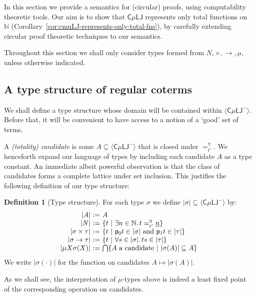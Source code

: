 \documentclass[10pt,a4paper]{amsart}
\theoremstyle{plain}
\theoremstyle{definition}
\newtheorem{definition}[definition]{Definition}
\theoremstyle{plain}
\theoremstyle{definition} %
\newcommand{\numeral}[1]{\underline{#1}}
\newcommand{\Nat}{\mathbb{N}}
\newcommand{\closure}[1]{\langle #1 \rangle}
\newcommand{\nat}{\mathit{N}}
\newcommand{\N}{\nat} %
\newcommand{\arrow}{\to}
\newcommand{\LJ}{\mathsf{LJ}}
\newcommand{\muLJ}{\mu\LJ}
\newcommand{\circular}{\mathsf C}
\newcommand{\cmuLJ}{\circular\muLJ}
\newcommand{\cmuLJneg}{\cmuLJ^-}
\newcommand{\proj}[1]{\mathsf{p}_{#1}}
\newcommand{\reductionnorec}{\mathrm{r}'}
\newcommand{\convertsnoreceta}{=_{\reductionnorec}^\eta} %
\newcommand{\hr}[1]{|#1|}
\begin{document}
In this section we provide a semantics for (circular) proofs, using computability theoretic tools.
Our aim is to show that $\cmuLJ$ represents only total functions on $\Nat$ (Corollary~\ref{cor:cmuLJ-represents-only-total-fns}), by carefully extending circular proof theoretic techniques to our semantics.

Throughout this section we shall only consider types formed from $\N, \times, \arrow, \mu$, unless otherwise indicated.

\subsection{A type structure of regular coterms}
We shall define a type structure whose domain will be contained within $\closure \cmuLJneg$. 
Before that, it will be convenient to have access to a notion of a `good' set of terms.
% 

A \emph{(totality) candidate} is some $A\subseteq \closure \cmuLJneg$ that is closed under $\convertsnoreceta$.
We henceforth expand our language of types by including each candidate $A$ as a type constant. 
% 
An immediate albeit powerful observation is that the class of candidates forms a complete lattice under set inclusion.
This justifies the following definition of our type structure:
\begin{definition}
    [Type structure]
    \label{def:hr}
    For each type $\sigma$ we define $\hr\sigma \subseteq \closure \cmuLJneg$ by:
    \[
    \begin{array}{r@{\ := \ }l}
         \hr A & A \\
         \hr \N & \{ t  \ \vert \ \exists n \in \Nat .\, t\convertsnoreceta \numeral n\} \\
         \hr {\sigma \times \tau} & \{ t \ \vert\ \proj 0 t \in \hr \sigma \text{ and }  \proj 1 t \in \hr \tau\} \\
         \hr {\sigma \to \tau} & \{ t \ \vert\ \forall s \in \hr \sigma. \, ts \in \hr\tau\} \\
         \hr {\mu X\sigma(X)} & \bigcap \{ A \text{ a candidate} \ \vert\ \hr{\sigma(A)}\subseteq A\}
    \end{array}
    \]
    We write $\hr{\sigma(\cdot)}$ for the function on candidates $A\mapsto \hr{\sigma(A)}$.
\end{definition}
As we shall see, the interpretation of $\mu$-types above is indeed a least fixed point of the corresponding operation on candidates.
\end{document}
